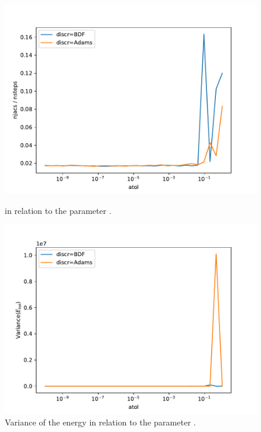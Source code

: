 \documentclass{report}
\begin{document}
\begin{figure}[h]
\centering
\begin{minipage}[t]{0.45\textwidth}
\centering
\includegraphics[width=\textwidth]{../Plots/Task4/Figure_411}
\caption{ in relation to the parameter .}
\label{pl:njacs_nsteps3}
\end{minipage}
\hfill
\begin{minipage}[t]{0.45\textwidth}
\centering
\includegraphics[width=\textwidth]{../Plots/Task4/Figure_404}
\caption{Variance of the energy in relation to the parameter .}
\label{pl:stability3}
\end{minipage}
\end{figure}
\end{document}

